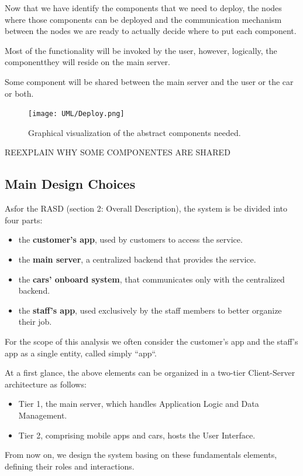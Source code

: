 \documentclass[11pt]{article} %
\begin{document}
Now that we have identify the components that we need to deploy, the nodes where those components can be deployed and the communication mechanism between the nodes we are ready to actually decide where to put each component.

Most of the functionality will be invoked by the user, however, logically, the componentthey will reside on the main server.

Some component will be shared between the main server and the user or the car or both.


\begin{figure}[H]
	\centering
	\texttt{[image: UML/Deploy.png]}
	\caption{Graphical visualization of the abstract components needed.}
\end{figure}	


REEXPLAIN WHY SOME COMPONENTES ARE SHARED






\subsection{Main Design Choices}

Asfor the RASD (section 2: Overall Description), the system is be divided into four parts:
\begin{itemize}[noitemsep]
	\item the \textbf{customer's app}, used by customers to access the service.
	\item the \textbf{main server}, a centralized backend that provides the service.
	\item the \textbf{cars’ onboard system}, that communicates only with the centralized backend.
	\item the \textbf{staff's app}, used exclusively by the staff members to better organize their job.
\end{itemize}

For the scope of this analysis we often consider the customer's app and the staff's app as a single entity, called simply ``app``.

At a first glance, the above elements can be organized in a two-tier Client-Server architecture as follows:
\begin{itemize}[noitemsep]
	\item Tier 1, the main server, which handles Application Logic and Data Management.
	\item Tier 2, comprising mobile apps and cars, hosts the User Interface.
\end{itemize}
From now on, we design the system basing on these fundamentals elements, defining their roles and interactions.
\end{document}
